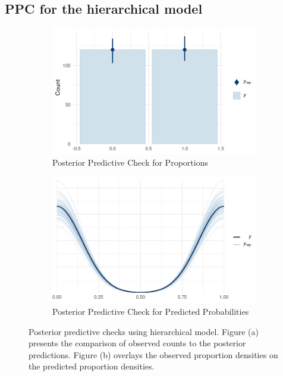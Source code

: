\documentclass[a4paper]{artikel3}
\begin{document}
\subsection{PPC for the hierarchical model}
\begin{figure}[htbp]
  \centering
  \begin{subfigure}[b]{0.45\textwidth}
    \includegraphics[width=\textwidth]{ppc_hier_1.png}
    \caption{Posterior Predictive Check for Proportions}
    \label{fig:ppc_proportions_2}
  \end{subfigure}
  \hfill %
  \begin{subfigure}[b]{0.45\textwidth}
    \includegraphics[width=\textwidth]{ppc_hier_2.png}
    \caption{Posterior Predictive Check for Predicted Probabilities}
    \label{fig:ppc_probabilities_2}
  \end{subfigure}
  \caption{Posterior predictive checks using hierarchical model. Figure (a) presents the comparison of observed counts to the posterior predictions. Figure (b) overlays the observed proportion densities on the predicted proportion densities.}
  \label{fig:ppc_checks_2}
\end{figure}
\end{document}
